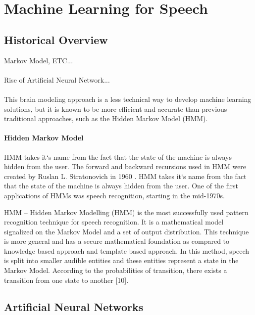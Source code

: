 \chapter{Machine Learning for Speech}\label{ch:machine_learning}

\section{Historical Overview}
Markov Model, ETC...\\\\
Rise of Artificial Neural Network...\\\\
This brain modeling approach is a less technical way to develop machine learning solutions, but it is known to be more efficient and accurate than previous traditional approaches,
such as the Hidden Markov Model (HMM). 

\subsubsection{Hidden Markov Model}
HMM takes it`s name from the fact that the state of the machine is always hidden from the user. 
The forward and backward recursions used in HMM  were created by Ruslan L. Stratonovich in 1960 \cite{stratonovich1960conditional}.
HMM takes it`s name from the fact that the state of the machine is always hidden from the user. One of the first applications of HMMs was speech recognition, starting in the mid-1970s.

HMM – Hidden Markov Modelling (HMM) is the most
successfully used pattern recognition technique for speech
recognition. It is a mathematical model signalized on the
Markov Model and a set of output distribution. This technique
is more general and has a secure mathematical foundation as 
compared to knowledge based approach and template based
approach. In this method, speech is split into smaller audible
entities and these entities represent a state in the Markov
Model. According to the probabilities of transition, there
exists a transition from one state to another [10]. 

\section{Artificial Neural Networks}

